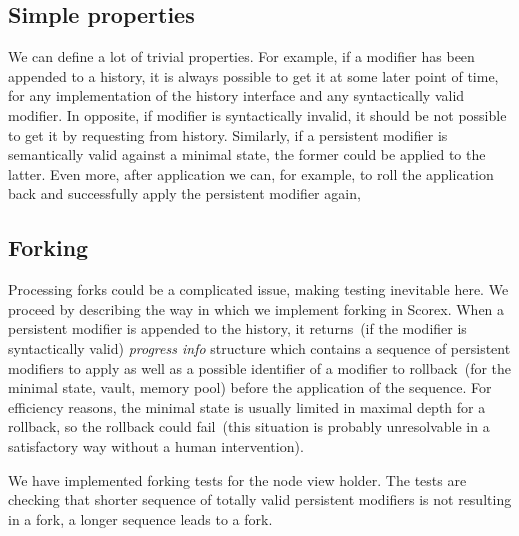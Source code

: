 \subsection{Simple properties}

We can define a lot of trivial properties. For example, if a modifier has been appended to a history, it is always possible to get it at some later point of time, for any implementation of the history interface and any syntactically valid modifier. In opposite, if modifier is syntactically invalid, it should be not possible to get it by requesting from history. Similarly, if a persistent modifier is semantically valid against a minimal state, the former could be applied to the latter. Even more, after application we can, for example, to roll the application back and successfully apply the persistent modifier again, 

\subsection{Forking}

Processing forks could be a complicated issue, making testing inevitable here. We proceed by describing the way in which we implement forking in Scorex. When a persistent modifier is appended to the history, it returns~(if the modifier is syntactically valid) {\em progress info} structure which contains a sequence of persistent modifiers to apply as well as a possible identifier of a modifier to rollback~(for the minimal state, vault, memory pool) before the application of the sequence. For efficiency reasons, the minimal state is usually limited in maximal depth for a rollback, so the rollback could fail~(this situation is probably unresolvable in a satisfactory way without a human intervention). 

We have implemented forking tests for the node view holder. The tests are checking that shorter sequence of totally valid persistent modifiers is not resulting in a fork, a longer sequence leads to a fork. 

